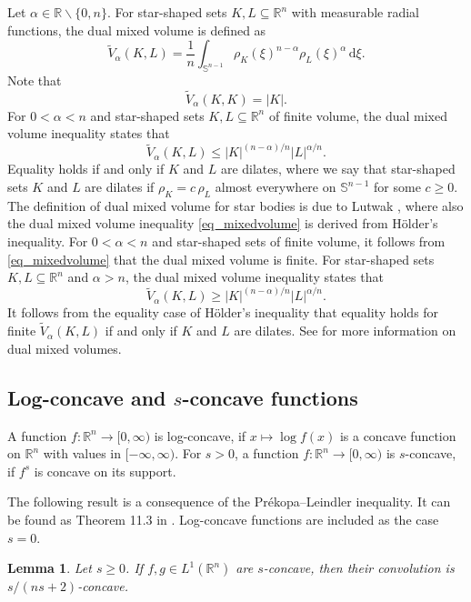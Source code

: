 \documentclass{amsart}
\newtheorem{lemma}[theorem]{Lemma}
\newcommand{\R}{\mathbb R}
\newcommand{\sn}{{\mathbb S}^{n-1}}
\renewcommand{\d}{\,\mathrm{d}}
\newcommand{\vol}[1]{\vert #1\vert}
\begin{document}
Let $\alpha\in\R\backslash\{0,n\}$. For star-shaped sets $K, L \subseteq \R^n$  with measurable radial functions, the dual mixed volume is defined as
\[\tilde V_\alpha(K,L) = \frac 1n \int_{\sn} \rho_K(\xi)^{n-\alpha} \rho_L(\xi)^{\alpha} \d \xi.\]
Note that 
\[\tilde V_\alpha(K,K) = \vol{K}.\]
For $0<\alpha<n$ and star-shaped sets $K, L \subseteq \R^n$ of finite volume, the dual mixed volume inequality states that 
\begin{equation}
    \label{eq_mixedvolume}
    \tilde V_{\alpha}(K,L) \leq \vol{K}^{({n-\alpha})/n} \vol{L}^{ \alpha/n}.
\end{equation}
Equality holds if and only if $K$ and $L$ are dilates, where we say that star-shaped sets $K$ and $L$ are dilates if $\rho_K=c\,\rho_L$ almost everywhere on $\sn$ for some $c\ge 0$. The definition of dual mixed volume for star bodies is due to Lutwak \cite{Lutwak75}, where also the dual mixed volume inequality \eqref{eq_mixedvolume} is derived from H\"older's inequality. For $0<\alpha<n$ and star-shaped sets of finite volume, it follows from \eqref{eq_mixedvolume} that the dual mixed volume is finite.
For star-shaped sets $K,L \subseteq \R^n$ and $\alpha>n$, the dual mixed volume inequality states that 
\begin{equation}
    \label{eq_mixedvolumere}
    \tilde V_{\alpha}(K,L) \geq \vol{K}^{({n-\alpha})/n} \vol{L}^{ \alpha/n}.
\end{equation}
It follows from the equality case of H\"older's inequality that equality holds for finite $\tilde V_{\alpha}(K, L)$ if and only if $K$ and $L$ are dilates. See \cite{Schneider:CB2, Gardner} for more information on dual mixed volumes. 


\subsection{Log-concave and $s$-concave functions}
A function $f: \R^n\to [0,\infty)$ is log-concave, if $x\mapsto \log f(x)$ is a concave function on $\R^n$ with values in $[-\infty, \infty)$. 
For $s>0$, a function $f: \R^n\to [0,\infty)$ is $s$-concave, if $f^s$ is concave on its support.


The following result is a consequence of the Pr\'ekopa--Leindler inequality. It can be found as Theorem 11.3 in \cite{Gardner_Gorizia}.  Log-concave functions are included as the case $s=0$.
\begin{lemma}\label{lem_GG}
Let $s\ge 0$. If $f, g\in L^1(\R^n)$ are $s$-concave, then their convolution is  $s/(ns+2)$-concave.
\end{lemma}
\end{document}
